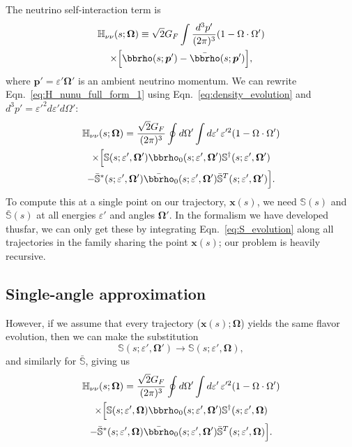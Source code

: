 \documentclass[aps,prd,twocolumn,superscriptaddress,groupedaddress]{revtex4}
\begin{document}
The neutrino self-interaction term is
\begin{multline}
  \label{eq:H_nunu_full_form_1}
  \mathbb{H}_{\nu\nu}(s;\bm{\Omega}) \equiv
  \sqrt{2} G_F
  \int \frac{d^3p'}{(2\pi)^3}
  (1-\Omega\cdot\Omega') \\
  \times
  \Big[\bbrho(s;\bm{p}')-\bar{\bbrho}(s;\bm{p}')\Big],
\end{multline}
where $\bm{p}'=\varepsilon' \bm{\Omega}'$ is an ambient neutrino
momentum. We can rewrite Eqn.~\ref{eq:H_nunu_full_form_1} using
Eqn.~\ref{eq:density_evolution} and
$d^3p'=\varepsilon'^2 d\varepsilon' d\Omega'$:
\begin{multline}
  \label{eq:H_nunu_full_form_2}
  \mathbb{H}_{\nu\nu}(s;\bm{\Omega}) =
  \frac{\sqrt{2} G_F}{(2\pi)^3}
  \oint d\Omega' \int d\varepsilon' \,\varepsilon'^2
  (1-\Omega\cdot\Omega') \\
  \times \Big[
    \mathbb{S}(s;\varepsilon',\bm{\Omega}')
    \bbrho_0(s;\varepsilon',\bm{\Omega}')
    \mathbb{S}^\dagger(s;\varepsilon',\bm{\Omega}') \\
    -\bar{\mathbb{S}}^*(s;\varepsilon',\bm{\Omega}')
    \bar{\bbrho}_0(s;\varepsilon',\bm{\Omega}')
    \bar{\mathbb{S}}^T(s;\varepsilon',\bm{\Omega}')
    \Big].
\end{multline}
To compute this at a single point on our trajectory, $\bm{x}(s)$,
we need $\mathbb{S}(s)$ and $\bar{\mathbb{S}}(s)$ at all
energies $\varepsilon'$ and angles $\bm{\Omega}'$. In the formalism
we have developed thusfar, we can only get these by integrating
Eqn.~\ref{eq:S_evolution} along all trajectories in the family
sharing the point $\bm{x}(s)$; our problem is heavily recursive.

\subsection*{Single-angle approximation}
However, if we assume that every trajectory ($\bm{x}(s);\bm{\Omega}$)
yields the same flavor evolution, then we can make the substitution
\begin{equation}
 \mathbb{S}(s;\varepsilon',\bm{\Omega}') \rightarrow
 \mathbb{S}(s;\varepsilon',\bm{\Omega}), \nonumber
\end{equation}
and similarly for $\bar{\mathbb{S}}$, giving us
\begin{multline}
  \label{eq:H_nunu_single_angle}
  \mathbb{H}_{\nu\nu}(s;\bm{\Omega}) =
  \frac{\sqrt{2} G_F}{(2\pi)^3}
  \oint d\Omega' \int d\varepsilon' \,\varepsilon'^2
  (1-\Omega\cdot\Omega') \\
  \times \Big[
    \mathbb{S}(s;\varepsilon',\bm{\Omega})
    \bbrho_0(s;\varepsilon',\bm{\Omega}')
    \mathbb{S}^\dagger(s;\varepsilon',\bm{\Omega}) \\
    -\bar{\mathbb{S}}^*(s;\varepsilon',\bm{\Omega})
    \bar{\bbrho}_0(s;\varepsilon',\bm{\Omega}')
    \bar{\mathbb{S}}^T(s;\varepsilon',\bm{\Omega})
    \Big].
\end{multline}
\end{document}
